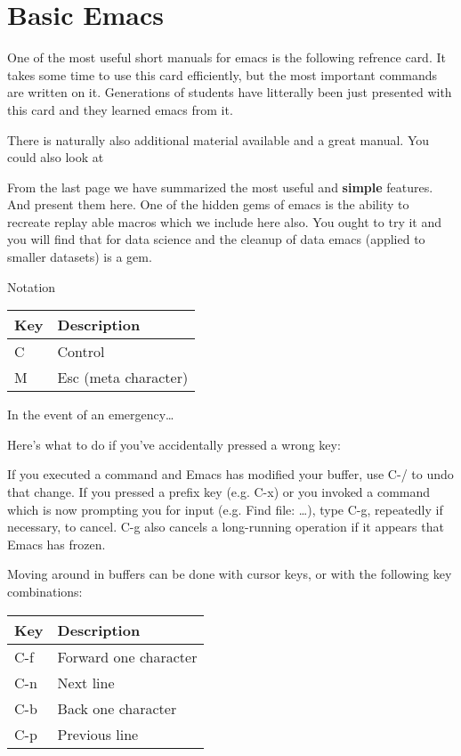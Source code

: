 \FILENAME

\section{Basic Emacs}
\label{C:emacs}

One of the most useful short manuals for emacs is the following refrence
card. It takes some time to use this card efficiently, but the most
important commands are written on it. Generations of students have
litterally been just presented with this card and they learned emacs
from it.



There is naturally also additional material available and a great
manual. You could also look at



From the last page we have summarized the most useful and
\textbf{simple} features. And present them here. One of the hidden gems
of emacs is the ability to recreate replay able macros which we include
here also. You ought to try it and you will find that for data science
and the cleanup of data emacs (applied to smaller datasets) is a gem.

Notation

\begin{longtable}[]{@{}ll@{}}
\toprule
Key & Description\tabularnewline
\midrule
\endhead
C & Control\tabularnewline
M & Esc (meta character)\tabularnewline
\bottomrule
\end{longtable}

In the event of an emergency\ldots{}

Here's what to do if you've accidentally pressed a wrong key:

If you executed a command and Emacs has modified your buffer, use C-/ to
undo that change. If you pressed a prefix key (e.g. C-x) or you invoked
a command which is now prompting you for input (e.g. Find file:
\ldots{}), type C-g, repeatedly if necessary, to cancel. C-g also
cancels a long-running operation if it appears that Emacs has frozen.

Moving around in buffers can be done with cursor keys, or with the
following key combinations:

\begin{longtable}[]{@{}ll@{}}
\toprule
Key & Description\tabularnewline
\midrule
\endhead
C-f & Forward one character\tabularnewline
C-n & Next line\tabularnewline
C-b & Back one character\tabularnewline
C-p & Previous line\tabularnewline
\bottomrule
\end{longtable}

